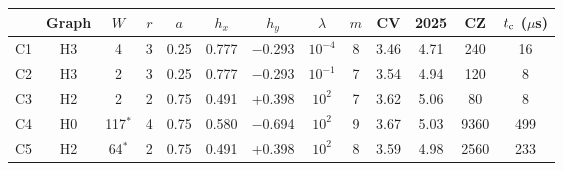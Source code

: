 \begin{tabular}{@{}lcccccccccccc@{}}
\toprule
& Graph & $W$ & $r$ & $a$ & $h_x$ & $h_y$ & $\lambda$ & $m$ & CV & 2025 & CZ & $t_{\rm c}$ ($\mu$s) \\
\midrule
C1 & H3 & 4 & 3 & 0.25 & 0.777 & $-$0.293 & $10^{-4}$ & 8 & 3.46 & 4.71 & 240 & 16 \\
C2 & H3 & 2 & 3 & 0.25 & 0.777 & $-$0.293 & $10^{-1}$ & 7 & 3.54 & 4.94 & 120 & 8 \\
C3 & H2 & 2 & 2 & 0.75 & 0.491 & +0.398 & $10^{2}$ & 7 & 3.62 & 5.06 & 80 & 8 \\
C4 & H0 & 117$^{*}$ & 4 & 0.75 & 0.580 & $-$0.694 & $10^{2}$ & 9 & 3.67 & 5.03 & 9360 & 499 \\
C5 & H2 & 64$^{*}$ & 2 & 0.75 & 0.491 & +0.398 & $10^{2}$ & 8 & 3.59 & 4.98 & 2560 & 233 \\
\bottomrule
\end{tabular}
